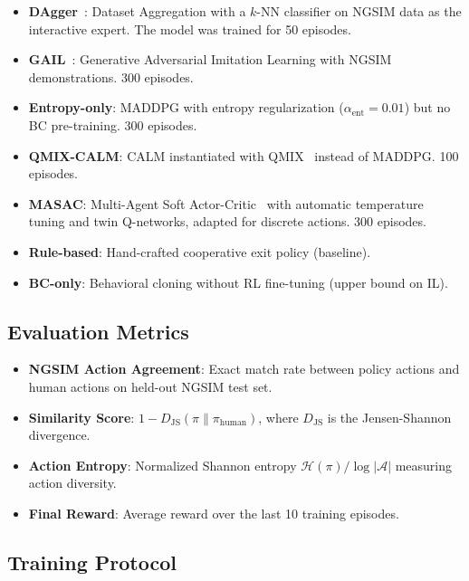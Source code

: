 \documentclass[journal]{IEEEtran}
\newcommand{\cA}{\mathcal{A}}
\begin{document}
\begin{itemize}
    \item \textbf{DAgger}~\cite{ross2011reduction}: Dataset Aggregation with a $k$-NN classifier on NGSIM data as the interactive expert. The model was trained for 50 episodes.
    \item \textbf{GAIL}~\cite{ho2016generative}: Generative Adversarial Imitation Learning with NGSIM demonstrations. 300 episodes.
    \item \textbf{Entropy-only}: MADDPG with entropy regularization ($\alpha_{\text{ent}} = 0.01$) but no BC pre-training. 300 episodes.
    \item \textbf{QMIX-CALM}: CALM instantiated with QMIX~\cite{rashid2018qmix} instead of MADDPG. 100 episodes.
    \item \textbf{MASAC}: Multi-Agent Soft Actor-Critic~\cite{haarnoja2018soft,christodoulou2019soft} with automatic temperature tuning and twin Q-networks, adapted for discrete actions. 300 episodes.
    \item \textbf{Rule-based}: Hand-crafted cooperative exit policy (baseline).
    \item \textbf{BC-only}: Behavioral cloning without RL fine-tuning (upper bound on IL).
\end{itemize}

\subsection{Evaluation Metrics}

\begin{itemize}
    \item \textbf{NGSIM Action Agreement}: Exact match rate between policy actions and human actions on held-out NGSIM test set.
    \item \textbf{Similarity Score}: $1 - D_{\text{JS}}(\pi \| \pi_{\text{human}})$, where $D_{\text{JS}}$ is the Jensen-Shannon divergence.
    \item \textbf{Action Entropy}: Normalized Shannon entropy $\mathcal{H}(\pi) / \log|\cA|$ measuring action diversity.
    \item \textbf{Final Reward}: Average reward over the last 10 training episodes.
\end{itemize}

\subsection{Training Protocol}
\end{document}
